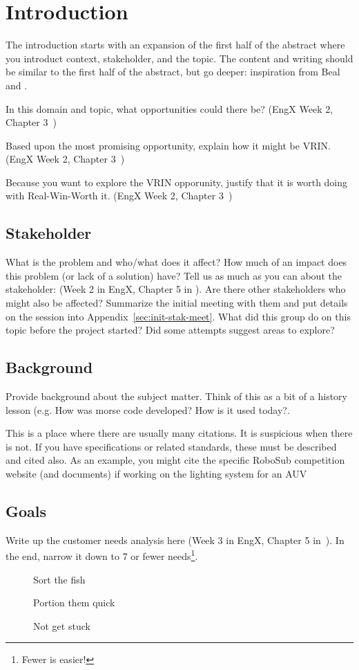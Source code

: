 \chapter{Introduction\label{cha:introduction}}
The introduction starts with an expansion of the first half of the abstract where you introduct context, stakeholder, and the topic.
The content and writing should be similar to the first half of the abstract, but go deeper:  inspiration from Beal~\cite{beal2016proto2paper} and \cite{edp2023matexlatextemplate}.

In this domain and topic, what opportunities could there be?  (EngX Week 2, Chapter 3~\cite{ulrich2020product-design-development})

Based upon the most promising opportunity, explain how it might be VRIN. (EngX Week 2, Chapter 3~\cite{ulrich2020product-design-development})

Because you want to explore the VRIN opporunity, justify that it is worth doing with Real-Win-Worth it. (EngX Week 2, Chapter 3~\cite{ulrich2020product-design-development})

\section{Stakeholder}
What is the problem and who/what does it affect?
How much of an impact does this problem (or lack of a solution) have?
Tell us as much as you can about the stakeholder: (Week 2 in EngX, Chapter 5 in \cite{ulrich2020product-design-development}).
Are there other stakeholders who might also be affected?
Summarize the initial meeting with them and put details on the session into Appendix~\ref{sec:init-stak-meet}.
What did this group do on this topic before the project started?
Did some attempts suggest areas to explore?
\section{Background}
Provide background about the subject matter.
Think of this as a bit of a history lesson (e.g. How was morse code
developed?  How is it used today?.

This is a place where there are usually many citations.
It is suspicious when there is not.
If you have specifications or related standards, these must be
described and cited also.
As an example, you might cite the specific
RoboSub competition website (and documents) if working on the lighting system for an AUV\cite{guls2016auvlight}

\section{Goals}
Write up the customer needs analysis here (Week 3 in EngX, Chapter 5 in~\cite{ulrich2020product-design-development}).
In the end, narrow it down to 7 or fewer needs\footnote{Fewer is easier!}. 
\begin{description}
  \item[]  Sort the fish
  \item[]
    Portion them quick
  \item[]  Not get stuck
\end{description}
 
